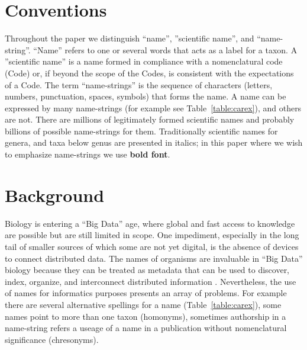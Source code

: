 \documentclass{bmcart}
\begin{document}


\section*{Conventions}

Throughout the paper we distinguish ``name'', ''scientific name'', and
``name-string''.  ``Name'' refers to one or several words that acts as a label
for a taxon. A ''scientific name'' is a name formed in compliance with a
nomenclatural code (Code) or, if beyond the scope of the Codes, is consistent
with the expectations of a Code.  The term ``name-strings'' is the sequence of
characters (letters, numbers, punctuation, spaces, symbols) that forms the
name.  A name can be expressed by many name-strings (for example see
Table~\ref{table:carex}), and others are not.  There are millions of
legitimately formed scientific names and probably billions of possible
name-strings for them. Traditionally scientific names for genera, and taxa
below genus are presented in italics; in this paper where we wish to emphasize
name-strings we use  \textbf{bold font}.

\section*{Background}

Biology is entering a ``Big Data'' age, where global and fast access to
knowledge are possible but are still limited in scope. One impediment,
especially in the long tail of smaller sources of which some are not yet
digital, is the absence of devices to connect distributed data.  The names of
organisms are invaluable in ``Big Data'' biology because they can be treated as
metadata that can be used to discover, index, organize, and interconnect
distributed information \cite{Patterson2010}.  Nevertheless, the use of names
for informatics purposes presents an array of problems. For example there are
several alternative spellings for a name (Table~\ref{table:carex}), some names
point to more than one taxon (homonyms), sometimes authorship in a name-string
refers a useage of a name in a publication without nomenclatural significance
(chresonyms).
\end{document}
